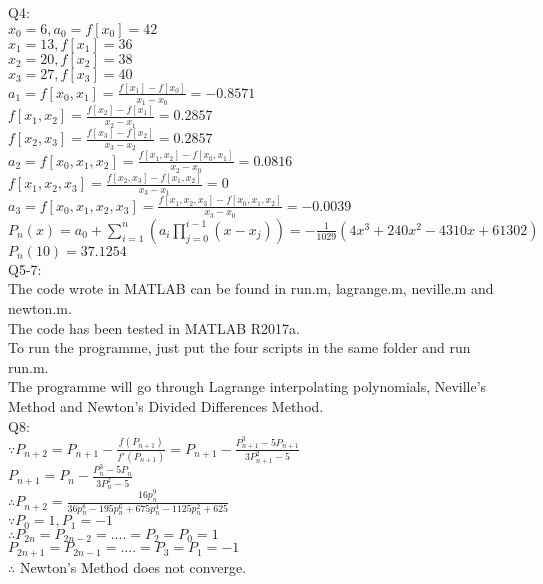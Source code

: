 \documentclass[a4paper]{article}
\begin{document}
Q4:\\
$x_0 = 6, a_0=f[x_0]=42$\\
$x_1 = 13, f[x_1]=36$\\
$x_2 = 20, f[x_2]=38$\\
$x_3 = 27, f[x_3]=40$\\
$a_1 = f[x_0, x_1]=\frac{f[x_1]-f[x_0]}{x_1-x_0}=-0.8571$\\
$f[x_1, x_2]=\frac{f[x_2]-f[x_1]}{x_2-x_1}=0.2857$\\
$f[x_2, x_3]=\frac{f[x_3]-f[x_2]}{x_3-x_2}=0.2857$\\
$a_2 = f[x_0, x_1, x_2]=\frac{f[x_1, x_2]-f[x_0, x_1]}{x_2-x_0}=0.0816$\\
$f[x_1, x_2, x_3]=\frac{f[x_2, x_3]-f[x_1, x_2]}{x_3-x_1}=0$\\
$a_3 = f[x_0, x_1, x_2, x_3]=\frac{f[x_1, x_2, x_3]-f[x_0, x_1, x_2]}{x_3-x_0}=-0.0039$\\
$P_n(x)=a_0+\sum\limits_{i=1}^{n}(a_i \prod\limits_{j=0}^{i-1}(x-x_j))=-\frac{1}{1029}(4x^3+240x^2-4310x+61302)$\\
$P_n(10)=37.1254$\\

Q5-7:\\
The code wrote in MATLAB can be found in run.m, lagrange.m, neville.m and newton.m.\\
The code has been tested in MATLAB R2017a.\\
To run the programme, just put the four scripts in the same folder and run run.m.\\
The programme will go through Lagrange interpolating polynomials, Neville’s Method and Newton’s Divided Differences Method.\\

Q8:\\
$\because P_{n+2} = P_{n+1} - \frac{f(P_{n+1})}{f'(P_{n+1})}= P_{n+1} - \frac{P_{n+1}^{3} - 5P_{n+1}}{3P_{n+1}^2-5}$\\
$P_{n+1} = P_{n} - \frac{P_{n}^{3} - 5P_{n}}{3P_{n}^2-5}$\\
$\therefore P_{n+2}=\frac{16p_n^9}{36p_n^8 - 195p_n^6 + 675p_n^4 - 1125p_n^2 + 625}$\\
$\because P_0=1, P_1=-1$\\
$\therefore P_{2n}=P_{2n-2}=....=P_2=P_0=1$\\
$ P_{2n+1}=P_{2n-1}=....=P_3=P_1=-1$\\
$\therefore$ Newton’s Method does not converge.
\end{document}
